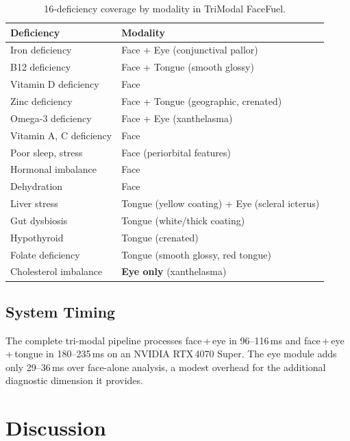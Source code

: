 \documentclass[journal]{IEEEtran}
\begin{document}
\begin{table}[h]
\centering
\caption{16-deficiency coverage by modality in TriModal FaceFuel.}
\label{tab:coverage}
\begin{tabular}{ll}
\toprule
\textbf{Deficiency} & \textbf{Modality} \\
\midrule
Iron deficiency          & Face + Eye (conjunctival pallor) \\
B12 deficiency           & Face + Tongue (smooth glossy) \\
Vitamin D deficiency     & Face \\
Zinc deficiency          & Face + Tongue (geographic, crenated) \\
Omega-3 deficiency       & Face + Eye (xanthelasma) \\
Vitamin A, C deficiency  & Face \\
Poor sleep, stress       & Face (periorbital features) \\
Hormonal imbalance       & Face \\
Dehydration              & Face \\
Liver stress             & Tongue (yellow coating) + Eye (scleral icterus) \\
Gut dysbiosis            & Tongue (white/thick coating) \\
Hypothyroid              & Tongue (crenated) \\
Folate deficiency        & Tongue (smooth glossy, red tongue) \\
Cholesterol imbalance    & \textbf{Eye only} (xanthelasma) \\
\bottomrule
\end{tabular}
\end{table}

\subsection{System Timing}

The complete tri-modal pipeline processes face\,+\,eye in 96--116\,ms
and face\,+\,eye\,+\,tongue in 180--235\,ms on an NVIDIA RTX\,4070
Super. The eye module adds only 29--36\,ms over face-alone analysis,
a modest overhead for the additional diagnostic dimension it provides.

\section{Discussion}
\label{sec:discussion}
\end{document}
